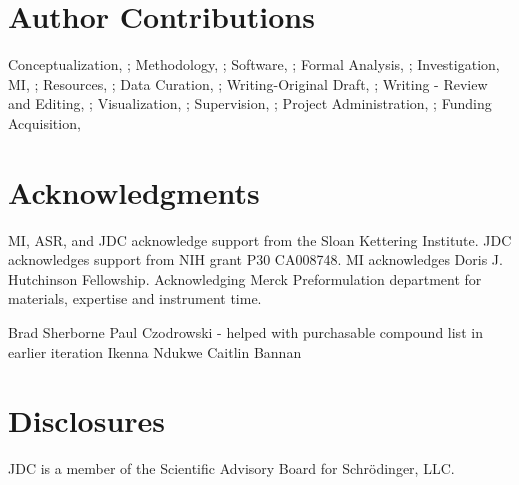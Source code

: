 \documentclass[9pt,lineno]{elife}
\begin{document}
\section{Author Contributions}

Conceptualization, ; Methodology, ; Software, ; Formal Analysis, ; Investigation, MI, ; Resources, ;  Data Curation, ; Writing-Original Draft, ; Writing - Review and Editing, ; Visualization, ; Supervision, ; Project Administration, ; Funding Acquisition, 


\section{Acknowledgments}

MI, ASR, and JDC acknowledge support from the Sloan Kettering Institute. JDC acknowledges support from NIH grant P30 CA008748. MI acknowledges Doris J. Hutchinson Fellowship. Acknowledging Merck Preformulation department for materials, expertise and instrument time.

Brad Sherborne  
Paul Czodrowski - helped with purchasable compound list in earlier iteration  
Ikenna Ndukwe  
Caitlin Bannan  

\section{Disclosures}

JDC is a member of the Scientific Advisory Board for Schr\"{o}dinger, LLC.

\nocite{*} %


\end{document}
